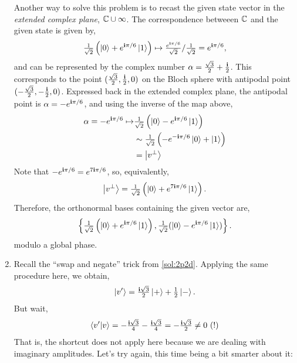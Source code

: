 \begin{enumerate}[label=\alph*.,ref={Sol.~\thesection\alph*}]
    Another way to solve this problem is to recast the given state vector in the \textit{extended complex plane}, $\mathbb{C} \cup \infty$.
    The correspondence betweeen $\mathbb{C}$ and the given state is given by,
    \begin{align*}
        \tfrac{1}{\sqrt{2}} \left ( \ket{0} + e^{\mathbf{i} \pi / 6} \ket{1} \right ) \mapsto \tfrac{e^{\mathbf{i} \pi / 6}}{\sqrt{2}} / \tfrac{1}{\sqrt{2}} = e^{\mathbf{i} \pi / 6},
    \end{align*}
    and can be represented by the complex number $\alpha = \tfrac{\sqrt{3}}{2} + \tfrac{\mathbf{i}}{2}$.
    This corresponds to the point $(\tfrac{\sqrt{3}}{2}, \tfrac{\mathbf{i}}{2}, 0)$ on the Bloch sphere with antipodal point
    $(-\tfrac{\sqrt{3}}{2}, -\tfrac{\mathbf{i}}{2}, 0)$.
    Expressed back in the extended complex plane, the antipodal point is $\alpha = -e^{\mathbf{i} \pi/6}$, and using the inverse of the map
    above,
    \begin{align*}
        \alpha = -e^{\mathbf{i} \pi/6}  \mapsto & \tfrac{1}{\sqrt{2}} \left ( \ket{0} -e^{\mathbf{i} \pi/6} \ket{1} \right ) \\
        &\sim \tfrac{1}{\sqrt{2}} \left (-e^{-\mathbf{i} \pi/6} \ket{0} + \ket{1} \right ) \\
        &= \ket{v^\perp}
    \end{align*}
    Note that $-e^{\mathbf{i} \pi/6} = e^{7 \mathbf{i} \pi/6}$, so, equivalently,
    \begin{align*}
        \ket{v^\perp} = \tfrac{1}{\sqrt{2}} \left ( \ket{0} + e^{7 \mathbf{i} \pi/6} \ket{1} \right ).
    \end{align*}
    Therefore, the orthonormal bases containing the given vector are,
    \begin{align*}
         \left \{ \tfrac{1}{\sqrt{2}} \left ( \ket{0} + e^{\mathbf{i} \pi / 6} \ket{1} \right ), \tfrac{1}{\sqrt{2}} (\ket{0} -  e^{\mathbf{i} \pi/6} \ket{1} ) \right \}.
    \end{align*}
    modulo a global phase.
    \item \label{sol:2p7d} Recall the ``swap and negate'' trick from \ref{sol:2p2d}.
    Applying the same procedure here, we obtain,
    \begin{align*}
        \ket{v'} = \tfrac{\mathbf{i} \sqrt{3}}{2} \ket{+} + {\tfrac{1}{2}} \ket{-}.
    \end{align*}
    But wait,
    \begin{align*}
        \bra{v'}\ket{v} = -\tfrac{\mathbf{i} \sqrt{3}}{4} - \tfrac{\mathbf{i} \sqrt{3}}{4} = - \tfrac{\mathbf{i} \sqrt{3}}{2} \neq 0~(!)
    \end{align*}
    That is, the shortcut does not apply here because we are dealing with imaginary amplitudes.
    Let's try again, this time being a bit smarter about it:
    \begin{align*}

\end{align*}
\end{enumerate}
